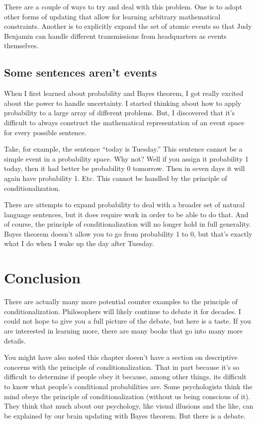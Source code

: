 There are a couple of ways to try and deal with this problem.  One is to adopt other forms of updating that allow for learning arbitrary mathematical constraints. Another is to explicitly expand the set of atomic events so that Judy Benjamin can handle different transmissions from headquarters as events themselves. 

\subsection{Some sentences aren't events}

When I first learned about probability and Bayes theorem, I got really excited about the power to handle uncertainty.  I started thinking about how to apply probability to a large array of different problems.  But, I discovered that it's difficult to always construct the mathematical representation of an event space for every possible sentence.

Take, for example, the sentence ``today is Tuesday.'' This sentence cannot be a simple event in a probability space.  Why not? Well if you assign it probability 1 today, then it had better be probability 0 tomorrow. Then in seven days it will again have probability 1.  Etc.  This cannot be handled by the principle of conditionalization.

There are attempts to expand probability to deal with a broader set of natural language sentences, but it does require work in order to be able to do that.  And of course, the principle of conditionalization will no longer hold in full generality.  Bayes theorem doesn't allow you to go from probability 1 to 0, but that's exactly what I do when I wake up the day after Tuesday.

\section{Conclusion}

There are actually many more potential counter examples to the principle of conditionalization. Philosophers will likely continue to debate it for decades.  I could not hope to give you a full picture of the debate, but here is a taste. If you are interested in learning more, there are many books that go into many more details.

You might have also noted this chapter doesn't have a section on descriptive concerns with the principle of conditionalization.  That in part because it's so difficult to determine if people obey it because, among other things, its difficult to know what people's conditional probabilities are.  Some psychologists think the mind obeys the principle of conditionalization (without us being conscious of it). They think that much about our psychology, like visual illusions and the like, can be explained by our brain updating with Bayes theorem. But there is a debate.

